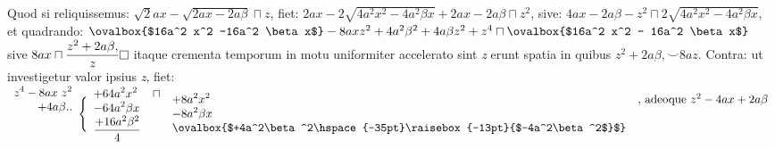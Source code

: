 Quod si reliquissemus: $\surd2ax-\sqrt{2ax-2a\beta}\sqcap z$, fiet: $2ax - 2\sqrt{4a^2 x^2 -4a^2 \beta x}+2ax-2a\beta\sqcap z^2$, sive: $4ax-2a\beta - z^2 \sqcap 2 \sqrt{4a^2 x^2 -4a^2 \beta x}$, et quadrando: $\ovalbox{$16a^2 x^2 -16a^2 \beta x$}-8axz^2 +4a^2 \beta^2 + 4a\beta z^2 + z^4 \sqcap \ovalbox{$16a^2 x^2 - 16a^2 \beta x$}$ sive $\displaystyle 8ax \sqcap \frac{z^2 + 2a\beta ,}{z}\raisebox{1mm}[0mm][0mm]{\boxed{}}$ itaque  crementa temporum in motu uniformiter accelerato\protect{} sint \textit{z} erunt spatia in quibus  $z^2 + 2a\beta , \smallsmile 8az$. Contra: ut investigetur valor ipsius \textit{z}, fiet:\newline
                               $\begin{array}{r}\displaystyle z^4- 8ax\hspace{3pt}z^2\\+4a\beta ..\\\rule[0cm]{0cm}{20pt}
                               \end{array}
                               \Bigg\{\begin{array}{ll}\displaystyle+64a^2x^2&\sqcap\\\displaystyle-64a^2\beta x&\\\displaystyle \frac{+16a^2\beta^2}{4}&\end{array}
                     \begin{array}{ll}\displaystyle+8a^2x^2&\text{, adeoque }z^2 - 4ax +2a\beta\\\displaystyle-8a^2\beta x&\\\displaystyle \ovalbox{$+4a^2\beta^2\hspace{-35pt}\raisebox{-13pt}{$-4a^2\beta^2$}$}&\end{array}$\newline
